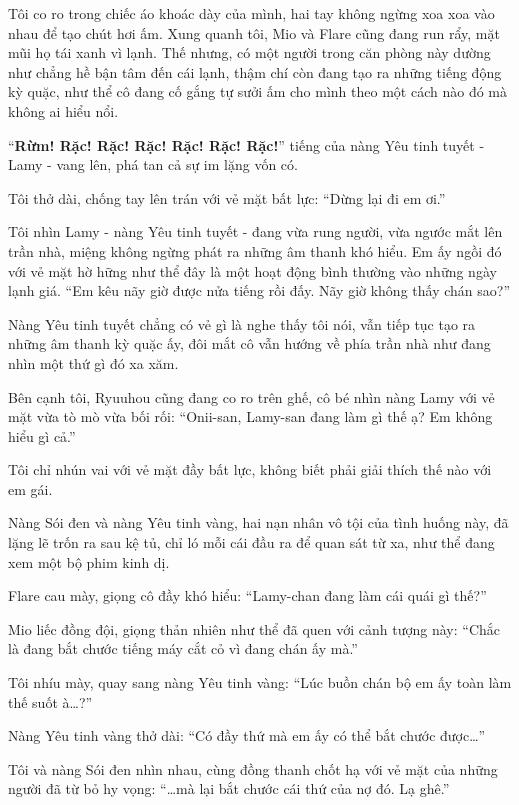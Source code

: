 \documentclass[../main.tex]{subfiles}
\begin{document}
Tôi co ro trong chiếc áo khoác dày của mình, hai tay không ngừng xoa xoa vào nhau để tạo chút hơi ấm. Xung quanh tôi, Mio và Flare cũng đang run rẩy, mặt mũi họ tái xanh vì lạnh. Thế nhưng, có một người trong căn phòng này dường như chẳng hề bận tâm đến cái lạnh, thậm chí còn đang tạo ra những tiếng động kỳ quặc, như thể cô đang cố gắng tự sưởi ấm cho mình theo một cách nào đó mà không ai hiểu nổi.

``\textbf{Rừm! Rặc! Rặc! Rặc! Rặc! Rặc! Rặc!}'' tiếng của nàng Yêu tinh tuyết - Lamy - vang lên, phá tan cả sự im lặng vốn có.


Tôi thở dài, chống tay lên trán với vẻ mặt bất lực: ``Dừng lại đi em ơi.''

Tôi nhìn Lamy - nàng Yêu tinh tuyết - đang vừa rung người, vừa ngước mắt lên trần nhà, miệng không ngừng phát ra những âm thanh khó hiểu. Em ấy ngồi đó với vẻ mặt hờ hững như thể đây là một hoạt động bình thường vào những ngày lạnh giá. ``Em kêu nãy giờ được nửa tiếng rồi đấy. Nãy giờ không thấy chán sao?''

Nàng Yêu tinh tuyết chẳng có vẻ gì là nghe thấy tôi nói, vẫn tiếp tục tạo ra những âm thanh kỳ quặc ấy, đôi mắt cô vẫn hướng về phía trần nhà như đang nhìn một thứ gì đó xa xăm.

Bên cạnh tôi, Ryuuhou cũng đang co ro trên ghế, cô bé nhìn nàng Lamy với vẻ mặt vừa tò mò vừa bối rối: ``Onii-san, Lamy-san đang làm gì thế ạ? Em không hiểu gì cả.''

Tôi chỉ nhún vai với vẻ mặt đầy bất lực, không biết phải giải thích thế nào với em gái.

Nàng Sói đen và nàng Yêu tinh vàng, hai nạn nhân vô tội của tình huống này, đã lặng lẽ trốn ra sau kệ tủ, chỉ ló mỗi cái đầu ra để quan sát từ xa, như thể đang xem một bộ phim kinh dị.


Flare cau mày, giọng cô đầy khó hiểu: ``Lamy-chan đang làm cái quái gì thế?''

Mio liếc đồng đội, giọng thản nhiên như thể đã quen với cảnh tượng này: ``Chắc là đang bắt chước tiếng máy cắt cỏ vì đang chán ấy mà.''

Tôi nhíu mày, quay sang nàng Yêu tinh vàng: ``Lúc buồn chán bộ em ấy toàn làm thế suốt à\dots?''

Nàng Yêu tinh vàng thở dài: ``Có đầy thứ mà em ấy có thể bắt chước được\dots''

Tôi và nàng Sói đen nhìn nhau, cùng đồng thanh chốt hạ với vẻ mặt của những người đã từ bỏ hy vọng: ``\dots mà lại bắt chước cái thứ của nợ đó. Lạ ghê.''
\end{document}
